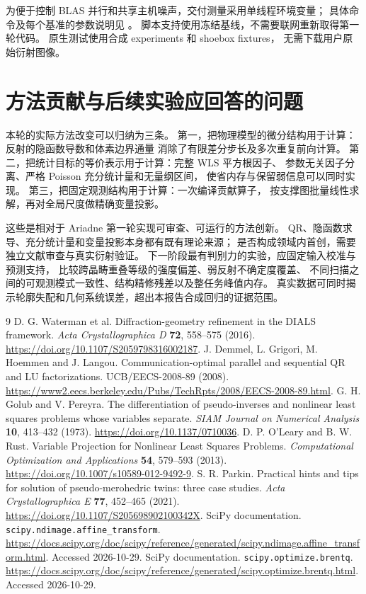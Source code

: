 \documentclass[UTF8,11pt,a4paper,fontset=fandol]{ctexart}
\begin{document}
为便于控制 BLAS 并行和共享主机噪声，交付测量采用单线程环境变量；
具体命令及每个基准的参数说明见 。
脚本支持使用冻结基线，不需要联网重新取得第一轮代码。
原生测试使用合成 experiments 和 shoebox fixtures，
无需下载用户原始衍射图像。

\section{方法贡献与后续实验应回答的问题}

本轮的实际方法改变可以归纳为三条。
第一，把物理模型的微分结构用于计算：反射的隐函数导数和体素边界通量
消除了有限差分步长及多次重复前向计算。
第二，把统计目标的等价表示用于计算：完整 WLS 平方根因子、
参数无关因子分离、严格 Poisson 充分统计量和无量纲区间，
使省内存与保留弱信息可以同时实现。
第三，把固定观测结构用于计算：一次编译贡献算子，
按支撑图批量线性求解，再对全局尺度做精确变量投影。

这些是相对于 Ariadne 第一轮实现可审查、可运行的方法创新。
QR、隐函数求导、充分统计量和变量投影本身都有既有理论来源；
是否构成领域内首创，需要独立文献审查与真实衍射验证。
下一阶段最有判别力的实验，应固定输入校准与预测支持，
比较跨晶畴重叠等级的强度偏差、弱反射不确定度覆盖、
不同扫描之间的可观测模式一致性、结构精修残差以及整任务峰值内存。
真实数据可同时揭示轮廓失配和几何系统误差，超出本报告合成回归的证据范围。

\begin{thebibliography}{9}
\footnotesize
\setlength{\parskip}{0pt}
\setlength{\itemsep}{2pt}
D. G. Waterman et al.
Diffraction-geometry refinement in the DIALS framework.
\emph{Acta Crystallographica D} \textbf{72}, 558--575 (2016).
\url{https://doi.org/10.1107/S2059798316002187}.
J. Demmel, L. Grigori, M. Hoemmen and J. Langou.
Communication-optimal parallel and sequential QR and LU factorizations.
UCB/EECS-2008-89 (2008).
\url{https://www2.eecs.berkeley.edu/Pubs/TechRpts/2008/EECS-2008-89.html}.
G. H. Golub and V. Pereyra.
The differentiation of pseudo-inverses and nonlinear least squares problems whose variables separate.
\emph{SIAM Journal on Numerical Analysis} \textbf{10}, 413--432 (1973).
\url{https://doi.org/10.1137/0710036}.
D. P. O'Leary and B. W. Rust.
Variable Projection for Nonlinear Least Squares Problems.
\emph{Computational Optimization and Applications} \textbf{54}, 579--593 (2013).
\url{https://doi.org/10.1007/s10589-012-9492-9}.
S. R. Parkin.
Practical hints and tips for solution of pseudo-merohedric twins: three case studies.
\emph{Acta Crystallographica E} \textbf{77}, 452--465 (2021).
\url{https://doi.org/10.1107/S205698902100342X}.
SciPy documentation. \texttt{scipy.ndimage.affine\_transform}.
\url{https://docs.scipy.org/doc/scipy/reference/generated/scipy.ndimage.affine_transform.html}.
Accessed 2026-10-29.
SciPy documentation. \texttt{scipy.optimize.brentq}.
\url{https://docs.scipy.org/doc/scipy/reference/generated/scipy.optimize.brentq.html}.
Accessed 2026-10-29.
\end{thebibliography}
\end{document}

